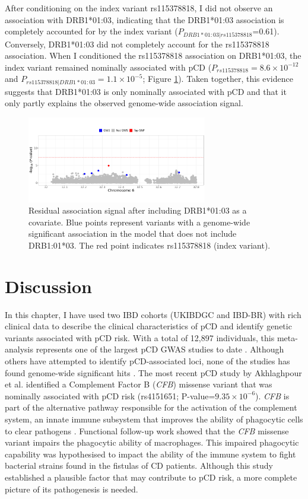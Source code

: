After conditioning on the index variant rs115378818, I did not observe an association with DRB1*01:03, indicating that the  DRB1*01:03 association is completely accounted for by the index variant ($P_{DRB1*01:03|rs115378818}$=0.61). Conversely, DRB1*01:03 did not completely account for the rs115378818 association. When I conditioned the rs115378818 association on DRB1*01:03, the index variant remained nominally associated with pCD ($P_{rs115378818}=8.6\times10^{-12}$ and  $P_{rs115378818|DRB1*01:03}=1.1\times10^{-5}$; Figure \ref{fig:residual_assoc_plot}). Taken together, this evidence suggests that  DRB1*01:03 is only nominally associated with pCD and that it only partly explains the observed genome-wide association signal. 

 
\begin{figure}[H] 
  \centering    
  \includegraphics[width=0.7\textwidth]{Vector/cond_regional_assoc_plot}
  \caption[Figure]{Residual association signal after including DRB1*01:03 as a covariate. Blue points represent variants with a genome-wide significant association in the model that does not include DRB1:01*03. The red point indicates rs115378818 (index variant).}
  \label{fig:residual_assoc_plot}
  \end{figure}

  
\section{Discussion}
In this chapter, I have used two IBD cohorts (UKIBDGC and IBD-BR) with rich clinical data to describe the clinical characteristics of pCD and identify genetic variants associated with pCD risk. With a total of 12,897 individuals, this meta-analysis represents one of the largest pCD GWAS studies to date \cite{Akhlaghpour2023-jw}. Although others have attempted to identify pCD-associated loci, none of the studies has found genome-wide significant hits \cite{Akhlaghpour2023-jw,Kaur2016-ut}. The most recent pCD study by Akhlaghpour et al. identified a Complement Factor B (\textit{CFB}) missense variant that was nominally associated with pCD risk (rs4151651; P-value=$9.35\times10^{-6}$). \textit{CFB} is part of the alternative pathway responsible for the activation of the complement system, an innate immune subsystem that improves the ability of phagocytic cells to clear pathogens \cite{Huang2002-of,Goring2009-cs}. Functional follow-up work showed that the \textit{CFB} missense variant impairs the phagocytic ability of macrophages. This impaired phagocytic capability was hypothesised to impact the ability of the immune system to fight bacterial strains found in the fistulas of CD patients. Although this study established a plausible factor that may contribute to pCD risk, a more complete picture of its pathogenesis is needed.\\


